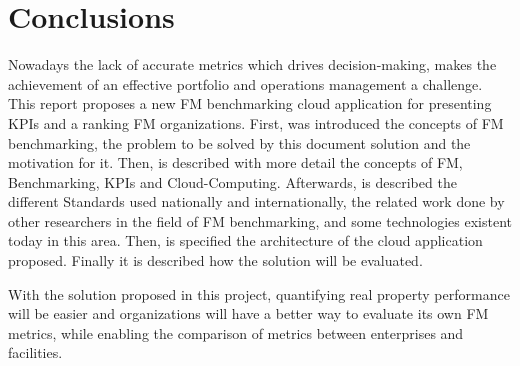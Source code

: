 
% 
% 

\section{Conclusions}
Nowadays the lack of accurate metrics which drives decision-making, makes the achievement of an effective portfolio and operations management a challenge.
This report proposes a new FM benchmarking cloud application for presenting KPIs and a ranking FM organizations. First, was introduced the concepts of FM benchmarking, the problem to be solved by this document solution and the motivation for it. Then, is described with more detail the concepts of FM, Benchmarking, KPIs and Cloud-Computing. Afterwards, is described the different Standards used nationally and internationally, the related work done by other researchers in the field of FM benchmarking, and some technologies existent today in this area. Then, is specified the architecture of the cloud application proposed. Finally it is described how the solution will be evaluated. 

With the solution proposed in this project, quantifying real property performance will be easier and organizations will have a better way to evaluate its own FM metrics, while enabling the comparison of metrics between enterprises and facilities.


